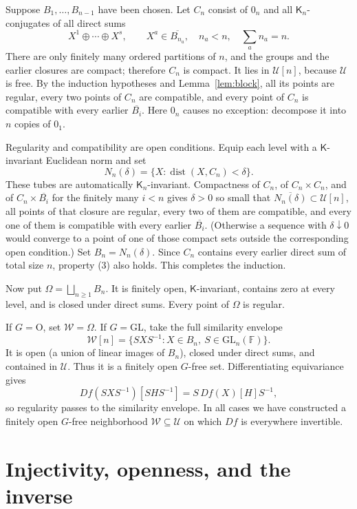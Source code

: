 \documentclass[11pt]{article}
\newcommand{\U}{\mathcal U}
\newcommand{\W}{\mathcal W}
\newcommand{\F}{\mathbb F}
\newcommand{\K}{\mathsf K}
\newcommand{\op}{\mathbin{\oplus}}
\begin{document}
Suppose $B_1,\ldots,B_{n-1}$ have been chosen.  Let $C_n$ consist of $0_n$
and all $\K_n$-conjugates of all direct sums
\[
 X^1\op\cdots\op X^s,\qquad
 X^a\in\overline{B_{n_a}},\quad n_a<n,\quad
 \sum_a n_a=n.
\]
There are only finitely many ordered partitions of $n$, and the groups and
the earlier closures are compact; therefore $C_n$ is compact.  It lies in
$\U[n]$, because $\U$ is free.  By the induction hypotheses and
Lemma~\ref{lem:block}, all its points are regular, every two points of $C_n$
are compatible, and every point of $C_n$ is compatible with every earlier
$\overline{B_i}$.  Here $0_n$ causes no exception: decompose it into $n$
copies of $0_1$.

Regularity and compatibility are open conditions.  Equip each level with a
$\K$-invariant Euclidean norm and set
\[
 N_n(\delta)=\{X:\operatorname{dist}(X,C_n)<\delta\}.
\]
These tubes are automatically $\K_n$-invariant.  Compactness of $C_n$, of
$C_n\times C_n$, and of
$C_n\times\overline{B_i}$ for the finitely many $i<n$ gives $\delta>0$ so
small that $\overline{N_n(\delta)}\subset\U[n]$, all points of that closure
are regular, every two of them are compatible, and every one of them is
compatible with every earlier $\overline{B_i}$.  (Otherwise a sequence with
$\delta\downarrow0$ would converge to a point of one of those compact sets
outside the corresponding open condition.)  Set $B_n=N_n(\delta)$.  Since
$C_n$ contains every earlier direct sum of total size $n$, property (3) also
holds.  This completes the induction.

Now put $\Omega=\bigsqcup_{n\geq1}B_n$.  It is finitely open, $\K$-invariant,
contains zero at every level, and is closed under direct sums.  Every point of
$\Omega$ is regular.

If $G=\mathrm O$, set $\W=\Omega$.  If $G=\mathrm{GL}$, take the full
similarity envelope
\[
 \W[n]=\{SXS^{-1}:X\in B_n,\ S\in\mathrm{GL}_n(\F)\}.
\]
It is open (a union of linear images of $B_n$), closed under direct sums, and
contained in $\U$.  Thus it is a finitely open $G$-free set.  Differentiating
equivariance gives
\[
 Df(SXS^{-1})[SHS^{-1}]=S\,Df(X)[H]S^{-1},
\]
so regularity passes to the similarity envelope.  In all cases we have
constructed a finitely open $G$-free neighborhood $\W\subseteq\U$ on which
$Df$ is everywhere invertible.

\section{Injectivity, openness, and the inverse}
\end{document}
